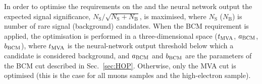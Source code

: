 In order to optimise the requirements on the \mbcm and the neural network output the expected
signal significance, $N_{\mathrm{S}}/\sqrt{N_{\mathrm{S}}+N_{\mathrm{B}}}$, is maximised,
where $N_\mathrm{S}$ ($N_\mathrm{B}$) is number of rare signal (background) candidates.
When the BCM requirement is applied, the optimisation is performed in a three-dimensional space
($t_{\rm MVA}$, $a_{\rm BCM}$, $b_{\rm BCM}$), where $t_{\rm MVA}$ is the neural-network output threshold below which
a candidate is considered background, and $a_{\rm BCM}$ and $b_{\rm BCM}$ are the parameters of the BCM
cut described in Sec.~\ref{sec:HOP}. Otherwise, only the MVA cut is optimised 
(this is the case for all muons samples and the high-\qsq electron sample).



